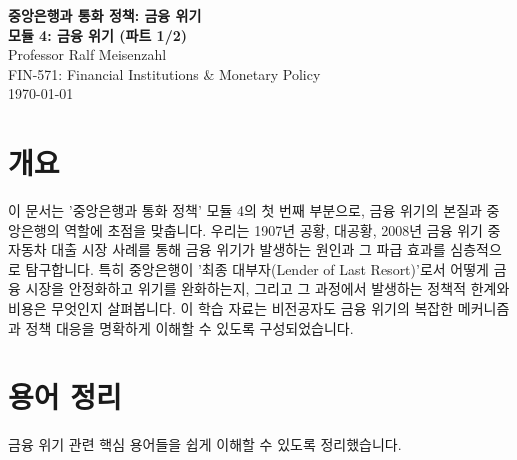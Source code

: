 \documentclass[11pt,a4paper]{article}
\begin{document}
\begin{center}
  \vspace*{2cm}
  {\Huge \textbf{중앙은행과 통화 정책: 금융 위기}} \\
  \vspace{0.5cm}
  {\Large \textbf{모듈 4: 금융 위기 (파트 1/2)}} \\
  \vspace{0.3cm}
  {\large Professor Ralf Meisenzahl} \\
  \vspace{0.2cm}
  {\normalsize FIN-571: Financial Institutions \& Monetary Policy} \\
  \vspace{1cm}
  \today
\end{center}

\newpage

\section*{개요}
이 문서는 '중앙은행과 통화 정책' 모듈 4의 첫 번째 부분으로, 금융 위기의 본질과 중앙은행의 역할에 초점을 맞춥니다. 우리는 1907년 공황, 대공황, 2008년 금융 위기 중 자동차 대출 시장 사례를 통해 금융 위기가 발생하는 원인과 그 파급 효과를 심층적으로 탐구합니다. 특히 중앙은행이 '최종 대부자(Lender of Last Resort)'로서 어떻게 금융 시장을 안정화하고 위기를 완화하는지, 그리고 그 과정에서 발생하는 정책적 한계와 비용은 무엇인지 살펴봅니다. 이 학습 자료는 비전공자도 금융 위기의 복잡한 메커니즘과 정책 대응을 명확하게 이해할 수 있도록 구성되었습니다.

\newpage

\section*{용어 정리}
금융 위기 관련 핵심 용어들을 쉽게 이해할 수 있도록 정리했습니다.
\end{document}
